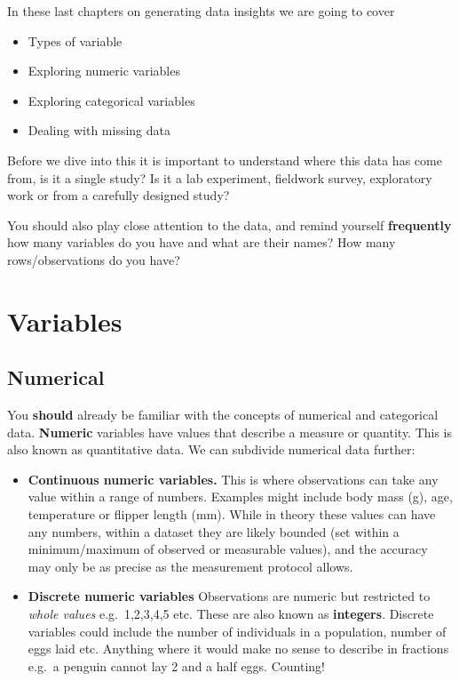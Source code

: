 \documentclass[
]{book}
\begin{document}
In these last chapters on generating data insights we are going to cover

\begin{itemize}
\item
  Types of variable
\item
  Exploring numeric variables
\item
  Exploring categorical variables
\item
  Dealing with missing data
\end{itemize}

Before we dive into this it is important to understand where this data has come from, is it a single study? Is it a lab experiment, fieldwork survey, exploratory work or from a carefully designed study?

You should also play close attention to the data, and remind yourself \textbf{frequently} how many variables do you have and what are their names? How many rows/observations do you have?

\hypertarget{variables}{%
\section{Variables}\label{variables}}

\hypertarget{numerical}{%
\subsection{Numerical}\label{numerical}}

You \textbf{should} already be familiar with the concepts of numerical and categorical data. \textbf{Numeric} variables have values that describe a measure or quantity. This is also known as quantitative data. We can subdivide numerical data further:

\begin{itemize}
\item
  \textbf{Continuous numeric variables.} This is where observations can take any value within a range of numbers. Examples might include body mass (g), age, temperature or flipper length (mm).
  While in theory these values can have any numbers, within a dataset they are likely bounded (set within a minimum/maximum of observed or measurable values), and the accuracy may only be as precise as the measurement protocol allows.
\item
  \textbf{Discrete numeric variables} Observations are numeric but restricted to \emph{whole values} e.g.~1,2,3,4,5 etc. These are also known as \textbf{integers}. Discrete variables could include the number of individuals in a population, number of eggs laid etc. Anything where it would make no sense to describe in fractions e.g.~a penguin cannot lay 2 and a half eggs. Counting!
\end{itemize}
\end{document}
